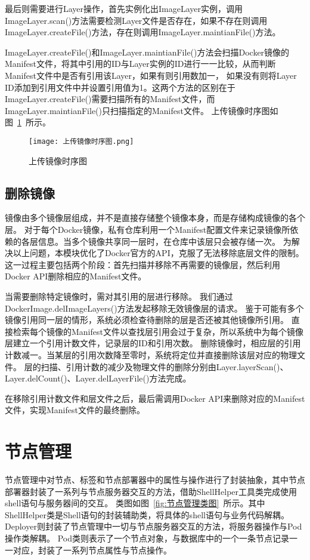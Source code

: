 最后则需要进行Layer操作，首先实例化出ImageLayer实例，调用ImageLayer.scan()方法需要检测Layer文件是否存在，如果不存在则调用ImageLayer.createFile()方法，存在则调用ImageLayer.maintianFile()方法。

ImageLayer.createFile()和ImageLayer.maintianFile()方法会扫描Docker镜像的Manifest文件，将其中引用的ID与Layer实例的ID进行一一比较，从而判断Manifest文件中是否有引用该Layer，如果有则引用数加一，
如果没有则将Layer ID添加到引用文件中并设置引用值为1。这两个方法的区别在于ImageLayer.createFile()需要扫描所有的Manifest文件，而ImageLayer.maintianFile()只扫描指定的Manifest文件。
上传镜像时序图如图~\ref{fig:上传镜像时序图}~所示。

\begin{figure}[h]
  \centering
  \texttt{[image: 上传镜像时序图.png]}
  \caption{上传镜像时序图}
  \label{fig:上传镜像时序图}
\end{figure}

\subsection{删除镜像}
镜像由多个镜像层组成，并不是直接存储整个镜像本身，而是存储构成镜像的各个层。
对于每个Docker镜像，私有仓库利用一个Manifest配置文件来记录镜像所依赖的各层信息。当多个镜像共享同一层时，在仓库中该层只会被存储一次。
为解决以上问题，本模块优化了Docker官方的API，克服了无法移除底层文件的限制。这一过程主要包括两个阶段：首先扫描并移除不再需要的镜像层，然后利用Docker API删除相应的Manifest文件。

当需要删除特定镜像时，需对其引用的层进行移除。
我们通过DockerImage.delImageLayers()方法发起移除无效镜像层的请求。
鉴于可能有多个镜像引用同一层的情形，系统必须检查待删除的层是否还被其他镜像所引用。
直接检索每个镜像的Manifest文件以查找层引用会过于复杂，所以系统中为每个镜像层建立一个引用计数文件，记录层的ID和引用次数。
删除镜像时，相应层的引用计数减一。当某层的引用次数降至零时，系统将定位并直接删除该层对应的物理文件。
层的扫描、引用计数的减少及物理文件的删除分别由Layer.layerScan()、Layer.delCount()、Layer.delLayerFile()方法完成。

在移除引用计数文件和层文件之后，最后需调用Docker API来删除对应的Manifest文件，实现Manifest文件的最终删除。


\section{节点管理}
节点管理中对节点、标签和节点部署器中的属性与操作进行了封装抽象，其中节点部署器封装了一系列与节点服务器交互的方法，借助ShellHelper工具类完成使用shell语句与服务器间的交互。
类图如图~\ref{fig:节点管理类图}~所示。其中ShellHelper类是Shell语句的封装辅助类，将具体的shell语句与业务代码解耦。
Deployer则封装了节点管理中一切与节点服务器交互的方法，将服务器操作与Pod操作类解耦。
Pod类则表示了一个节点对象，与数据库中的一个一条节点记录一一对应，封装了一系列节点属性与节点操作。

